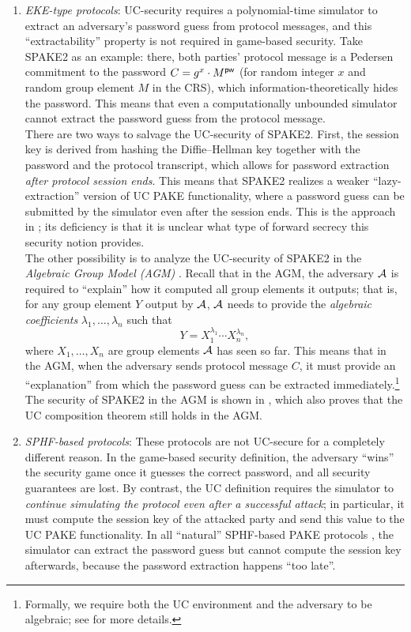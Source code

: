 \begin{enumerate}
  \item \emph{EKE-type protocols}: UC-security requires a polynomial-time simulator to extract an adversary's password guess from protocol messages, and this ``extractability'' property is not required in game-based security. Take SPAKE2 as an example: there, both parties' protocol message is a Pedersen commitment to the password $C = g^x \cdot M^{\mathsf{pw}}$ (for random integer $x$ and random group element $M$ in the CRS), which information-theoretically hides the password. This means that even a computationally unbounded simulator cannot extract the password guess from the protocol message.\\
      There are two ways to salvage the UC-security of SPAKE2. First, the session key is derived from hashing the Diffie--Hellman key together with the password and the protocol transcript, which allows for password extraction \emph{after protocol session ends}. This means that SPAKE2 realizes a weaker ``lazy-extraction'' version of UC PAKE functionality, where a password guess can be submitted by the simulator even after the session ends. This is the approach in \cite{C:ABBJKX20}; its deficiency is that it is unclear what type of forward secrecy this security notion provides. \\
      The other possibility is to analyze the UC-security of SPAKE2 in the \emph{Algebraic Group Model (AGM)} \cite{C:FucKilLos18}. Recall that in the AGM, the adversary $\mathcal{A}$ is required to ``explain'' how it computed all group elements it outputs; that is, for any group element $Y$ output by $\mathcal{A}$, $\mathcal{A}$ needs to provide the \emph{algebraic coefficients} $\lambda_1,\dots,\lambda_n$ such that
      \[
      Y = X_1^{\lambda_1}\cdots X_n^{\lambda_n},
      \]
      where $X_1,\dots,X_n$ are group elements $\mathcal{A}$ has seen so far. This means that in the AGM, when the adversary sends protocol message $C$, it must provide an ``explanation'' from which the password guess can be extracted immediately.\footnote{Formally, we require both the UC environment and the adversary to be algebraic; see \cite{AC:ABKLX21} for more details.} The security of SPAKE2 in the AGM is shown in \cite{AC:ABKLX21}, which also proves that the UC composition theorem still holds in the AGM.
  \item \emph{SPHF-based protocols}: These protocols are not UC-secure for a completely different reason. In the game-based security definition, the adversary ``wins'' the security game once it guesses the correct password, and all security guarantees are lost. By contrast, the UC definition requires the simulator to \emph{continue simulating the protocol even after a successful attack}; in particular, it must compute the session key of the attacked party and send this value to the UC PAKE functionality. In all ``natural'' SPHF-based PAKE protocols \cite{EC:KatOstYun01,SAC:JiaGon04,AC:KatVai09a,TCC:KatVai11}, the simulator can extract the password guess but cannot compute the session key afterwards, because the password extraction happens ``too late''. \\

\end{enumerate}
